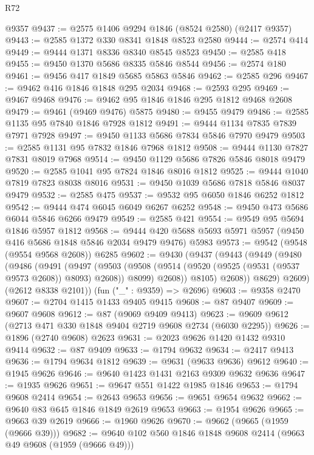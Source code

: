 \begin{lexlean}{R72}
\begin{coremodule}
    @9357
@9437 := @2575 @1406 @9294 @1846 (@8524 @2580) (@2417 @9357)
@9443 := @2585 @1372 @330 @8341 @1848 @8523 @2580
@9444 := @2574 @414
@9449 := @9444 @1371 @8336 @8340 @8545 @8523
@9450 := @2585 @418
@9455 := @9450 @1370 @5686 @8335 @5846 @8544
@9456 := @2574 @180
@9461 := @9456 @417 @1849 @5685 @5863 @5846
@9462 := @2585 @296
@9467 := @9462 @416 @1846 @1848 @295 @2034
@9468 := @2593 @295
@9469 := @9467 @9468
@9476 := @9462 @95 @1846 @1846 @295 @1812 @9468 @2608
@9479 := @9461 (@9469 @9476) @5875
@9480 := @9455 @9479
@9486 := @2585 @1135 @95 @7840 @1846 @7928 @1812
@9491 := @9444 @1134 @7835 @7839 @7971 @7928
@9497 := @9450 @1133 @5686 @7834 @5846 @7970 @9479
@9503 := @2585 @1131 @95 @7832 @1846 @7968 @1812
@9508 := @9444 @1130 @7827 @7831 @8019 @7968
@9514 := @9450 @1129 @5686 @7826 @5846 @8018 @9479
@9520 := @2585 @1041 @95 @7824 @1846 @8016 @1812
@9525 := @9444 @1040 @7819 @7823 @8038 @8016
@9531 := @9450 @1039 @5686 @7818 @5846 @8037 @9479
@9532 := @2585 @475
@9537 := @9532 @95 @6050 @1846 @6252 @1812
@9542 := @9444 @474 @6045 @6049 @6267 @6252
@9548 := @9450 @473 @5686 @6044 @5846 @6266 @9479
@9549 := @2585 @421
@9554 := @9549 @95 @5694 @1846 @5957 @1812
@9568 := @9444 @420 @5688 @5693 @5971 @5957 (@9450 @416 @5686 @1848 @5846 @2034 @9479 @9476) @5983
@9573 := @9542 (@9548 (@9554 @9568 @2608)) @6285
@9602 := @9430
    (@9437
      (@9443
        (@9449
          (@9480
            (@9486
              (@9491
                (@9497
                  (@9503
                    (@9508 (@9514 (@9520 (@9525 (@9531 (@9537 @9573 @2608)) @8093) @2608)) @8099)
                    @2608))
                @8105)
              @2608))
          @8629)
        @2609)
      (@2612 @8338 @2101))
    (fun ("_" : @9359) => @2696)
@9603 := @9358 @2470
@9607 := @2704 @1415 @1433 @9405 @9415
@9608 := @87 @9407
@9609 := @9607 @9608
@9612 := @87 (@9069 @9409 @9413)
@9623 := @9609 @9612 (@2713 @471 @330 @1848 @9404 @2719 @9608 @2734 (@6030 @2295))
@9626 := @1896 (@2740 @9608) @2623
@9631 := @2023 @9626 @1420 @1432 @9310 @9414
@9632 := @87 @9409
@9633 := @1794 @9632
@9634 := @2417 @9413
@9636 := @1794 @9634 @1812
@9639 := @9631 (@9633 @9636) @9612
@9640 := @1945 @9626
@9646 := @9640 @1423 @1431 @2163 @9309 @9632 @9636
@9647 := @1935 @9626
@9651 := @9647 @551 @1422 @1985 @1846
@9653 := @1794 @9608 @2414
@9654 := @2643 @9653
@9656 := @9651 @9654 @9632
@9662 := @9640 @83 @645 @1846 @1849 @2619 @9653
@9663 := @1954 @9626
@9665 := @9663 @39 @2619
@9666 := @1960 @9626
@9670 := @9662 (@9665 (@1959 (@9666 @39)))
@9682 := @9640 @102 @560 @1846 @1848 @9608 @2414 (@9663 @49 @9608 (@1959 (@9666 @49)))

\end{coremodule}
\end{lexlean}
